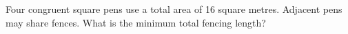 Four congruent square pens use a total area of 16 square metres. Adjacent pens may share fences. What is the minimum total fencing length?
